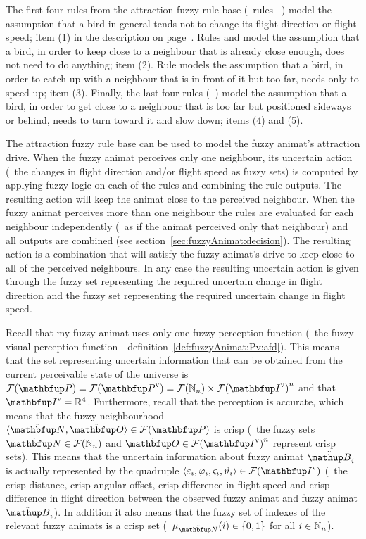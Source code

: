 The first four rules from the attraction fuzzy rule base (\ie\ rules --) model the assumption that a bird in general tends not to change its flight direction or flight speed; item (1) in the description on page~\pageref{dscr:attraction}. Rules  and  model the assumption that a bird, in order to keep close to a neighbour that is already close enough, does not need to do anything; item (2). Rule  models the assumption that a bird, in order to catch up with a neighbour that is in front of it but too far, needs only to speed up; item (3). Finally, the last four rules (--) model the assumption that a bird, in order to get close to a neighbour that is too far but positioned sideways or behind, needs to turn toward it and slow down; items (4) and (5). 

The attraction fuzzy rule base can be used to model the fuzzy animat's attraction drive. When the fuzzy animat perceives only one neighbour, its uncertain action (\ie\ the changes in flight direction and/or flight speed as fuzzy sets) is computed by applying fuzzy logic on each of the rules and combining the rule outputs. The resulting action will keep the animat close to the perceived neighbour. When the fuzzy animat perceives more than one neighbour the rules are evaluated for each neighbour independently (\ie\ as if the animat perceived only that neighbour) and all outputs are combined (see section~\ref{sec:fuzzyAnimat:decision}). The resulting action is a combination that will satisfy the fuzzy animat's drive to keep close to all of the perceived neighbours. In any case the resulting uncertain action is given through the fuzzy set representing the required uncertain change in flight direction and the fuzzy set representing the required uncertain change in flight speed.

Recall that my fuzzy animat uses only one fuzzy perception function (\ie\ the fuzzy visual perception function---definition~\ref{def:fuzzyAnimat:Pv:afd}). This means that the set representing uncertain information that can be obtained from the current perceivable state of the universe is $\fpowset{\set{P}}=\fpowset{\set{P}^\textnormal{v}}=\fpowset{\N_n} \times \fpowset{\set{I}^\textnormal{v}}^n$ and that $\set{I}^\textnormal{v}=\R^4$. Furthermore, recall that the perception is accurate, which means that the fuzzy neighbourhood $\langle \fset{N}, \fset{O} \rangle \in \fpowset{\set{P}}$ is crisp (\ie\ the fuzzy sets $\fset{N} \in \fpowset{\N_n}$ and $\fset{O} \in \fpowset{\set{I}^\textnormal{v}}^n$ represent crisp sets). This means that the uncertain information about fuzzy animat $\fautom{B}_i$ is actually represented by the quadruple $\langle \varepsilon_i, \varphi_i, \varsigma_i, \vartheta_i \rangle \in \fpowset{\set{I}^\textnormal{v}}$ (\ie\ the crisp distance, crisp angular offset, crisp difference in flight speed and crisp difference in flight direction between the observed fuzzy animat and fuzzy animat $\fautom{B}_i$). In addition it also means that the fuzzy set of indexes of the relevant fuzzy animats is a crisp set (\ie\ $\mu_\fset{N}(i) \in \left\{0,1\right\}$ for all $i \in \mathbb{N}_n$). 

